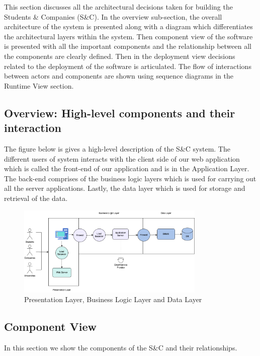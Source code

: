 This section discusses all the architectural decisions taken for building the Students \& Companies (S\&C). In the overview sub-section, the overall architecture of the system is presented along with a diagram which differentiates the architectural layers within the system. Then component view of the software is presented with all the important components and the relationship between all the components are clearly defined. Then in the deployment view decisions related to the deployment of the software is articulated. The flow of interactions between actors and components are shown using sequence diagrams in the Runtime View section. \\

\subsection{Overview: High-level components and their interaction}
The figure below is gives a high-level description of the S\&C system. The different users of system interacts with the client side of our web application which is called the front-end of our application and is in the Application Layer. The back-end comprises of the business logic layers which is used for carrying out all the server applications. Lastly, the data layer which is used for storage and retrieval of the data.

\begin{figure}[H]
\centering
\includegraphics[width=0.8\textwidth]{Images/overview-component.png}
\caption{\label{fig:metamodel4}Presentation Layer, Business Logic Layer and Data Layer}
\end{figure}

\subsection{Component View}
In this section we show the components of the S\&C and their relationships. 

